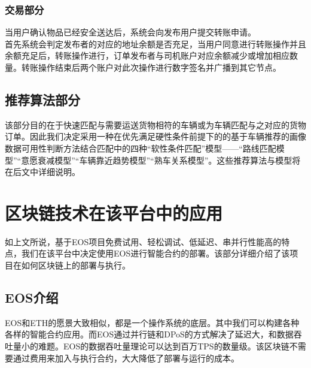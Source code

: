 \documentclass[UTF8]{ctexart}
\begin{document}
\begin{multicols}{2}
  \subsubsection{交易部分}
  当用户确认物品已经安全送达后，系统会向发布用户提交转账申请。\\
  \indent 首先系统会判定发布者的对应的地址余额是否充足，当用户同意进行转账操作并且余额充足后，转账操作进行，订单发布者与司机账户对应余额减少或增加相应数量。转账操作结束后两个账户对此次操作进行数字签名并广播到其它节点。
  \subsection{推荐算法部分}
  该部分目的在于快速匹配与需要运送货物相符的车辆或为车辆匹配与之对应的货物订单。因此我们决定采用一种在优先满足硬性条件前提下的的基于车辆推荐的画像数据可用性判断方法结合匹配中的四种“软性条件匹配”模型\cite{ref3}——“路线匹配模型”“意愿衰减模型”“车辆靠近趋势模型”“熟车关系模型”。这些推荐算法与模型将在后文中详细说明。
  \section{区块链技术在该平台中的应用}
  如上文所说，基于EOS项目免费试用、轻松调试、低延迟、串并行性能高的特点，我们在该平台中决定使用EOS进行智能合约的部署。该部分详细介绍了该项目在如何区块链上的部署与执行。
  \subsection{EOS介绍}
  \indent EOS和ETH的愿景大致相似，都是一个操作系统的底层。其中我们可以构建各种各样的智能合约应用。而EOS通过并行链和DPoS的方式解决了延迟大，和数据吞吐量小的难题。EOS的数据吞吐量理论可以达到百万TPS的数量级。该区块链不需要通过费用来加入与执行合约，大大降低了部署与运行的成本。\\

\end{multicols}
\end{document}
